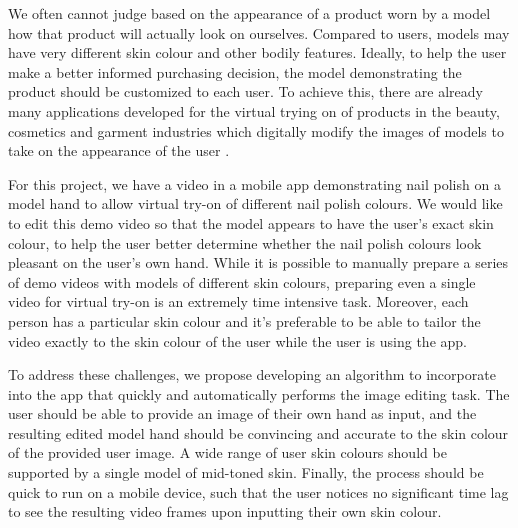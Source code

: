 We often cannot judge based on the appearance of a product worn by a model how that product will actually look on ourselves. Compared to users, models may have very different skin colour and other bodily features. Ideally, to help the user make a better informed purchasing decision, the model demonstrating the product should be customized to each user. To achieve this, there are already many applications developed for the virtual trying on of products in the beauty, cosmetics and garment industries which digitally modify the images of models to take on the appearance of the user \cite{zhang_2017_try} \cite{shilkrot_2013_garment, li_2015_replace}.

For this project, we have a video in a mobile app demonstrating nail polish on a model hand to allow virtual try-on of different nail polish colours. We would like to edit this demo video so that the model appears to have the user's exact skin colour, to help the user better determine whether the nail polish colours look pleasant on the user's own hand. While it is possible to manually prepare a series of demo videos with models of different skin colours, preparing even a single video for virtual try-on is an extremely time intensive task. Moreover, each person has a particular skin colour and it's preferable to be able to tailor the video exactly to the skin colour of the user while the user is using the app.

To address these challenges, we propose developing an algorithm to incorporate into the app that quickly and automatically performs the image editing task. The user should be able to provide an image of their own hand as input, and the resulting edited model hand should be convincing and accurate to the skin colour of the provided user image. A wide range of user skin colours should be supported by a single model of mid-toned skin. Finally, the process should be quick to run on a mobile device, such that the user notices no significant time lag to see the resulting video frames upon inputting their own skin colour.

